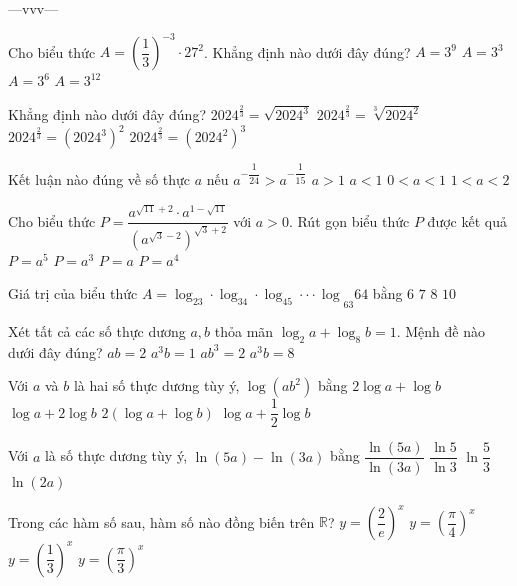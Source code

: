 \begin{name}
	{\tenchude}{\tendethi}{---vvv---}{\thoigian}
\end{name}
\setcounter{ex}{0}\setcounter{bt}{0}
\begin{ex}
Cho biểu thức $A=\left(\dfrac{1}{3}\right)^{-3} \cdot 27^2$. Khẳng định nào dưới đây đúng?
\choice
{$A=3^9$}
{$A=3^3$}
{$A=3^6$}
{$A={3^{12}}$}
\end{ex}
\begin{ex}
Khẳng định nào dưới đây đúng?
\choice
{${{2024}^{\tfrac{2}{3}}}=\sqrt{{{2024}^3}}$}
{${{2024}^{\tfrac{2}{3}}}=\sqrt[3]{{{2024}^2}}$}
{${{2024}^{\tfrac{2}{3}}}={{\left({{2024}^3}\right)}^2}$}
{${{2024}^{\tfrac{2}{3}}}={{\left({{2024}^2}\right)}^3}$}
\end{ex}
\begin{ex}
Kết luận nào đúng về số thực $a$ nếu ${a^{-\dfrac{1}{24}}}>{a^{-\dfrac{1}{15}}}$
\choice
{$a>1$}
{$a<1$}
{$0<a<1$}
{$1<a<2$}
\end{ex}
\begin{ex}
Cho biểu thức $P=\dfrac{{a^{\sqrt{11}+2}} \cdot {a^{1-\sqrt{11}}}}{{{\left({a^{\sqrt{3}-2}}\right)}^{\sqrt{3}+2}}}$ với $a>0$. Rút gọn biểu thức $P$ được kết quả
\choice
{$P=a^5$}
{$P=a^3$}
{$P=a$}
{$P=a^4$}
\end{ex}
\begin{ex}
Giá trị của biểu thức $A={{\log _23 \cdot \log _34 \cdot \log _45 \cdot \cdot \cdot \log }_{63}}64$ bằng
\choice
{$6$}
{$7$}
{$8$}
{$10$}
\end{ex}
\begin{ex}
Xét tất cả các số thực dương $a,b$ thỏa mãn $\log _2a+\log _8b=1$. Mệnh đề nào dưới đây đúng?
\choice
{$ab=2$}
{$a^3b=1$}
{$ab^3=2$}
{$a^3b=8$}
\end{ex}
\begin{ex}
Với $a$ và $b$ là hai số thực dương tùy ý, $\log \left(ab^2\right)$ bằng
\choice
{$2\log a+\log b$}
{$\log a+2\log b$}
{$2\left(\log a+\log b\right)$}
{$\log a+\dfrac{1}{2}\log b$}
\end{ex}
\begin{ex}
Với $a$ là số thực dương tùy ý, $\ln (5a)-\ln (3a)$ bằng
\choice
{$\dfrac{\ln (5a)}{\ln (3a)}$}
{$\dfrac{\ln 5}{\ln 3}$}
{$\ln \dfrac{5}{3}$}
{$\ln (2a)$}
\end{ex}
\begin{ex}
Trong các hàm số sau, hàm số nào đồng biến trên $\mathbb{R}$?
\choice
{$y=\left(\dfrac{2}{e}\right)^x$}
{$y={{\left(\dfrac{\pi }{4}\right)}^x}$}
{$y={{\left(\dfrac{1}{3}\right)}^x}$}
{$y={{\left(\dfrac{\pi }{3}\right)}^x}$}
\end{ex}
